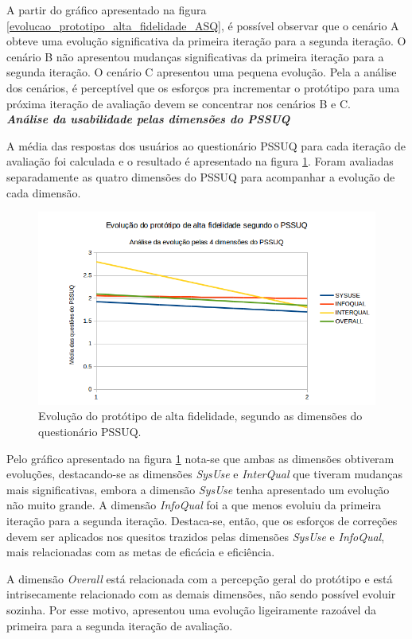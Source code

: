 	A partir do gráfico apresentado na figura \ref{evolucao_prototipo_alta_fidelidade_ASQ}, é possível observar que o 
	cenário A obteve uma evolução significativa da primeira iteração para a segunda iteração.
	O cenário B não apresentou mudanças significativas da primeira iteração para a segunda iteração. O cenário C apresentou 
	uma pequena evolução. Pela a análise dos cenários, é perceptível que os esforços pra incrementar o protótipo para uma 
	próxima iteração de avaliação devem se concentrar nos cenários B e C.\\
	
	\noindent
	\emph{\textbf{Análise da usabilidade pelas dimensões do PSSUQ}}
	
	A média das respostas dos usuários ao questionário PSSUQ para cada iteração de avaliação foi calculada e
	o resultado é apresentado na figura \ref{evolucao_prototipo_PSSUQ}.
	Foram avaliadas separadamente as quatro dimensões do PSSUQ para acompanhar a evolução de cada dimensão.
	
	\begin{figure}[!htpb]
	  \centering
	  \includegraphics[scale=0.8]{editaveis/figuras/evolucao_prototipo_PSSUQ}
	  \caption[Evolução do protótipo de alta fidelidade, segundo as dimensões do questionário PSSUQ]
	    {Evolução do protótipo de alta fidelidade, segundo as dimensões do questionário PSSUQ.}
	  \label{evolucao_prototipo_PSSUQ}
	\end{figure}
	
	Pelo gráfico apresentado na figura \ref{evolucao_prototipo_PSSUQ} nota-se que ambas as dimensões obtiveram 
	evoluções, destacando-se as dimensões \textit{SysUse} e \textit{InterQual} que tiveram mudanças mais significativas, embora
	a dimensão \textit{SysUse} tenha apresentado um evolução não muito grande.
	A dimensão \textit{InfoQual} foi a que menos evoluiu da primeira iteração para a segunda iteração. Destaca-se, então,
	que os esforços de correções devem ser aplicados nos quesitos trazidos pelas dimensões \textit{SysUse} e \textit{InfoQual},
	mais relacionadas com as metas de eficácia e eficiência.
	
	A dimensão \textit{Overall} está relacionada com a percepção geral do protótipo e está intrisecamente relacionado com as 
	demais dimensões, não sendo possível evoluir sozinha. Por esse motivo, apresentou uma evolução ligeiramente razoável da primeira
	para a segunda iteração de avaliação.
      
      
    
